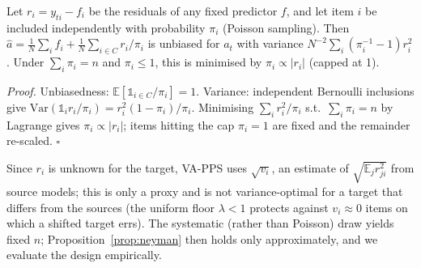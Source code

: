 \begin{proposition}\label{prop:neyman}
Let $r_i=y_{ti}-f_i$ be the residuals of any fixed predictor $f$, and let item $i$ be included independently with probability $\pi_i$ (Poisson sampling). Then $\hat a=\frac1N\sum_i f_i+\frac1N\sum_{i\in C}r_i/\pi_i$ is unbiased for $a_t$ with variance $N^{-2}\sum_i(\pi_i^{-1}-1)r_i^2$. Under $\sum_i\pi_i=n$ and $\pi_i\le1$, this is minimised by $\pi_i\propto|r_i|$ (capped at 1).
\end{proposition}
\noindent\emph{Proof.} Unbiasedness: $\mathbb E[\mathbb 1_{i\in C}/\pi_i]=1$. Variance: independent Bernoulli inclusions give $\mathrm{Var}(\mathbb 1_i r_i/\pi_i)=r_i^2(1-\pi_i)/\pi_i$. Minimising $\sum_i r_i^2/\pi_i$ s.t.\ $\sum_i\pi_i=n$ by Lagrange gives $\pi_i\propto|r_i|$; items hitting the cap $\pi_i=1$ are fixed and the remainder re-scaled. $\square$

\noindent Since $r_i$ is unknown for the target, VA-PPS uses $\sqrt{v_i}$, an estimate of $\sqrt{\mathbb E_j r_{ji}^2}$ from source models; this is only a proxy and is not variance-optimal for a target that differs from the sources (the uniform floor $\lambda<1$ protects against $v_i\approx 0$ items on which a shifted target errs). The systematic (rather than Poisson) draw yields fixed $n$; Proposition~\ref{prop:neyman} then holds only approximately, and we evaluate the design empirically.

